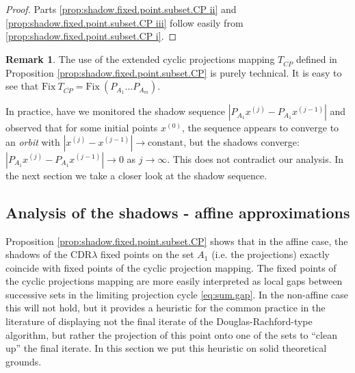 \documentclass[12pt]{article}
\theoremstyle{definition}
\newtheorem{remark}{Remark}
\newcommand{\Fix}{\mathrm{Fix}\ }
\begin{document}
\begin{proof}
Parts \eqref{prop:shadow.fixed.point.subset.CP ii} and \eqref{prop:shadow.fixed.point.subset.CP iii}
follow easily from \eqref{prop:shadow.fixed.point.subset.CP i}.
%
\end{proof}

\begin{remark}\label{rem:fix.CP.bar.eq.fix.CP}
The use of the extended cyclic projections mapping $T_{\overline{CP}}$ defined in
Proposition \ref{prop:shadow.fixed.point.subset.CP} is purely technical.
It is easy to see that  $\Fix T_{\overline{CP}}= \Fix (P_{A_1}\dots P_{A_m})$.
\end{remark}

In practice, have we monitored the shadow sequence $|P_{A_1} x^{(j)} - P_{A_1} x^{(j-1)}|$ and observed that for some initial points $x^{(0)}$, the sequence appears to converge to an {\em orbit} with $|x^{(j)} - x^{(j-1)}| \to \mbox{constant}$,
but the shadows converge:  $|P_{A_1} x^{(j)} - P_{A_1} x^{(j-1)}| \to 0$ as $j \to \infty$. This does not contradict our analysis.  In the
next section we take a closer look at the shadow sequence.

\subsection{Analysis of the shadows - affine approximations}\label{s:shadows}
Proposition \ref{prop:shadow.fixed.point.subset.CP} shows that in the affine case, the shadows of the CDR$\lambda$ fixed points on the set $A_1$ (i.e. the projections) exactly coincide with fixed points of the cyclic projection mapping.  The fixed points of the cyclic projections mapping are more easily interpreted as local gaps between successive sets in the limiting projection cycle \eqref{eq:sum.gap}.  In the non-affine case this will not hold, but it provides a heuristic for the common practice in the literature of displaying not the final iterate of the Douglas-Rachford-type algorithm, but rather the projection of this point onto one of the sets to ``clean up'' the final iterate.  In this section we put this heuristic on solid theoretical grounds.
\end{document}
